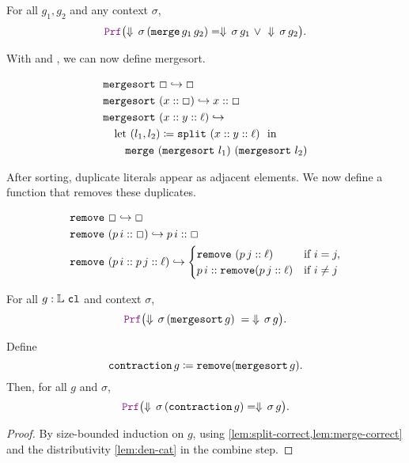 \begin{lemma}\label{lem:merge-correct}
For all \(g_1,g_2\) and any context \(\sigma\),
\[
\prf\bigl(\Downarrow\,\sigma\,(\kw{merge}\,g_1\,g_2) = \Downarrow\,\sigma\,g_1 \ \vee\ \Downarrow\,\sigma\,g_2 \bigr).
\]
\end{lemma}

With  and , we can now define mergesort.


\begin{definition}[mergesort]
\begin{align*}
&\texttt{\upshape{mergesort}}~\Box \hookrightarrow \Box \\
&\texttt{\upshape{mergesort}}~(x :: \Box) \hookrightarrow x :: \Box \\
&\texttt{\upshape{mergesort}}~(x :: y :: \ell) \hookrightarrow \\
  & \quad \text{let } (l_1,l_2) \coloneqq \texttt{\upshape{split}}~(x :: y :: \ell)\ \text{ in }\ \\
  & \qquad \texttt{\upshape{merge}}~(\texttt{\upshape{mergesort}}~l_1)~(\texttt{\upshape{mergesort}}~l_2)
\end{align*}
\end{definition}

After sorting, duplicate literals appear as adjacent elements. We now define a function that removes these duplicates.


\begin{definition}
\begin{align*}
&\texttt{\upshape{remove}}~\Box \hookrightarrow \Box \\
&\texttt{\upshape{remove}}~(p\,i :: \Box) \hookrightarrow p\,i :: \Box \\
&\texttt{\upshape{remove}}~(p\,i :: p\,j :: \ell) \hookrightarrow
\begin{cases}
  \texttt{\upshape{remove}}~(p\,j :: \ell) & \text{if } i = j, \\
  p\,i :: \texttt{\upshape{remove}}(p\,j :: \ell) & \text{if } i \neq j
\end{cases}
\end{align*}
\end{definition}

\begin{theorem}\label{thm:mergesort-correct}
For all \(g: \mathbb{L}~\texttt{\upshape{cl}}\) and context \(\sigma\),
\[
  \prf\bigl(\Downarrow\,\sigma\,(\kw{mergesort}\,g) \;=\; \Downarrow\,\sigma\,g\bigr).
\]
\end{theorem}

\begin{theorem}\label{thm:contraction-correct}
Define
\[
  \texttt{\upshape{contraction}}\,g \coloneq \texttt{\upshape{remove}} (\texttt{\upshape{mergesort}}\,g).
\]
Then, for all \(g\) and \(\sigma\),
\[
\prf\bigl(\Downarrow\,\sigma\,(\kw{contraction}\,g) = \Downarrow\,\sigma\,g\bigr).
\]
\begin{proof}
By size-bounded induction on \(g\), using \cref{lem:split-correct,lem:merge-correct} and the distributivity \cref{lem:den-cat} in the combine step.
\end{proof}
\end{theorem}

